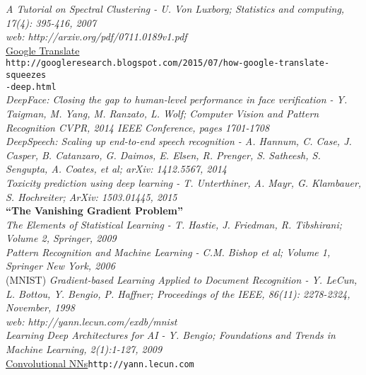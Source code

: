 \documentclass[12pt]{article}
\begin{document}
\textit{A Tutorial on Spectral Clustering - U. Von Luxborg; Statistics and computing, 17(4): 395-416, 2007\\
web: http://arxiv.org/pdf/0711.0189v1.pdf}\\

\href{http://googleresearch.blogspot.com/2015/07/how-google-translate-squeezes-deep.html}{Google Translate}\\ \verb+http://googleresearch.blogspot.com/2015/07/how-google-translate-squeezes+\\ \verb+-deep.html+\\

\textit{DeepFace: Closing the gap to human-level performance in face verification - Y. Taigman, M. Yang, M. Ranzato, L. Wolf; Computer Vision and Pattern Recognition CVPR, 2014 IEEE Conference, pages 1701-1708}\\

\textit{DeepSpeech: Scaling up end-to-end speech recognition - A. Hannum, C. Case, J. Casper, B. Catanzaro, G. Daimos, E. Elsen, R. Prenger, S. Satheesh, S. Sengupta, A. Coates, et al; arXiv: 1412.5567, 2014}\\

\textit{Toxicity prediction using deep learning - T. Unterthiner, A. Mayr, G. Klambauer, S. Hochreiter; ArXiv: 1503.01445, 2015}\\

\textbf{``The Vanishing Gradient Problem''}\\

\textit{The Elements of Statistical Learning - T. Hastie, J. Friedman, R. Tibshirani; Volume 2, Springer, 2009}\\

\textit{Pattern Recognition and Machine Learning - C.M. Bishop et al; Volume 1, Springer New York, 2006}\\

(MNIST) \textit{Gradient-based Learning Applied to Document Recognition - Y. LeCun, L. Bottou, Y. Bengio, P. Haffner; Proceedings of the IEEE, 86(11): 2278-2324, November, 1998 \\
web: http://yann.lecun.com/exdb/mnist}\\

\textit{Learning Deep Architectures for AI - Y. Bengio; Foundations and Trends in Machine Learning, 2(1):1-127, 2009}\\

\href{http://yann.lecun.com}{Convolutional NNs}\verb+http://yann.lecun.com+\\
\end{document}
